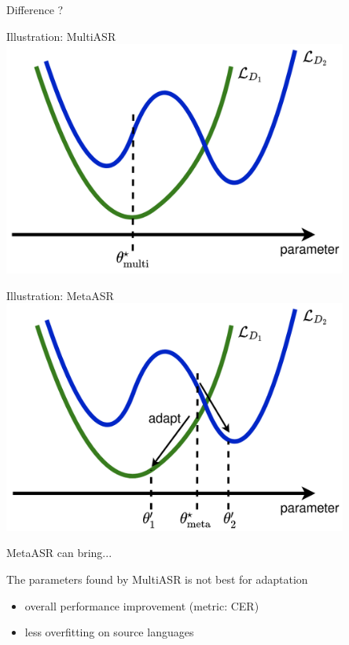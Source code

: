 \documentclass{beamer}
\begin{document}
\begin{frame}
	\begin{center}
    \LARGE{Difference ?}
	\end{center}
\end{frame}

\begin{frame}[t]{Illustration: MultiASR}
  \center \includegraphics[width=0.85\textwidth]{fig/multi_illustration.png}
\end{frame}

\begin{frame}[t]{Illustration: MetaASR}
  \center \includegraphics[width=0.85\textwidth]{fig/meta_illustration.png} 
\end{frame}

\begin{frame}[t]{MetaASR can bring...}
  \begin{center}
  The parameters found by MultiASR is not best for adaptation
  \end{center}

  \begin{itemize}
    \item overall performance improvement (metric: CER)
    \item less overfitting on source languages
  \end{itemize}
  \flushright \hyperlink{another example}{}
\end{frame}
\end{document}
